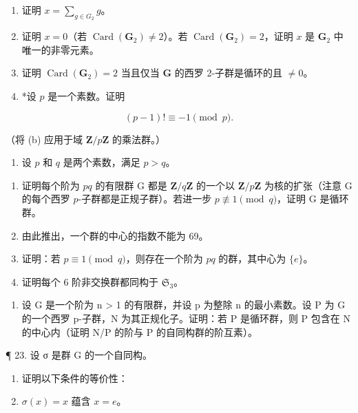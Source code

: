 \begin{enumerate}
\def\labelenumi{(\alph{enumi})}
\item
  证明 \(x = \sum_{g \in G_2} g\)。
\item
  证明 \(x = 0\)（若 \(\operatorname{Card}(\mathbf{G}_2) \neq 2\)）。若 \(\operatorname{Card}(\mathbf{G}_2) = 2\)，证明 \(x\) 是 \(\mathbf{G}_2\) 中唯一的非零元素。
\item
  证明 \(\operatorname{Card}(\mathbf{G}_2) = 2\) 当且仅当 \(\mathbf{G}\) 的西罗 2-子群是循环的且 \(\neq 0\)。
\item
  *设 \(p\) 是一个素数。证明
\end{enumerate}

\[
(p - 1)! \equiv - 1 \pmod {p}.
\]

（将 (b) 应用于域 \(\mathbf{Z} / p\mathbf{Z}\) 的乘法群。）

\begin{enumerate}
\def\labelenumi{\arabic{enumi}。}
\setcounter{enumi}{20}
\tightlist
\item
  设 \(p\) 和 \(q\) 是两个素数，满足 \(p > q\)。
\end{enumerate}

\begin{enumerate}
\def\labelenumi{(\alph{enumi})}
\item
  证明每个阶为 \(pq\) 的有限群 G 都是 \(\mathbf{Z}/q\mathbf{Z}\) 的一个以 \(\mathbf{Z}/p\mathbf{Z}\) 为核的扩张（注意 G 的每个西罗 \(p\)-子群都是正规子群）。若进一步 \(p \not\equiv 1 \pmod{q}\)，证明 G 是循环群。
\item
  由此推出，一个群的中心的指数不能为 69。
\item
  证明：若 \(p \equiv 1 \pmod{q}\)，则存在一个阶为 \(pq\) 的群，其中心为 \(\{e\}\)。
\item
  证明每个 6 阶非交换群都同构于 \(\mathfrak{S}_3\)。
\end{enumerate}

\begin{enumerate}
\def\labelenumi{\arabic{enumi}。}
\setcounter{enumi}{21}
\tightlist
\item
  设 G 是一个阶为 n \textgreater{} 1 的有限群，并设 p 为整除 n 的最小素数。设 P 为 G 的一个西罗 p-子群，N 为其正规化子。证明：若 P 是循环群，则 P 包含在 N 的中心内（证明 N/P 的阶与 P 的自同构群的阶互素）。
\end{enumerate}

¶ 23. 设 σ 是群 G 的一个自同构。

\begin{enumerate}
\def\labelenumi{(\alph{enumi})}
\item
  证明以下条件的等价性：
\item
  \(\sigma(x) = x\) 蕴含 \(x = e\)。
\end{enumerate}

